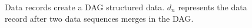 
\begin{figure}
	\centering
	
	\caption[Data records in the Zupply framework]{Data records create a DAG structured data. $d_n$ represents the data record after two data sequences merges in the DAG.}
	\label{fig:zupply-datachain}
\end{figure}

